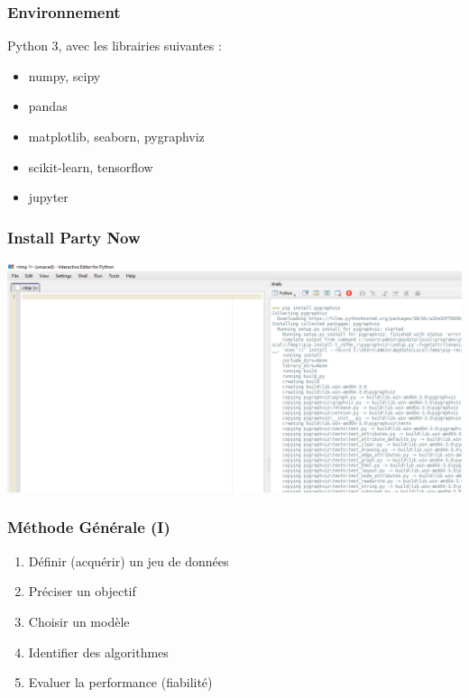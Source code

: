 \documentclass[11pt]{beamer}
\newenvironment{slide}[1]{%
\begin{frame}[environment=slide]
\frametitle{#1}
}{%
\end{frame}
}
\begin{document}
\begin{slide}{Environnement}
Python 3, avec les librairies suivantes :\\

\begin{itemize}
	\item numpy, scipy
	\item pandas
	\item matplotlib, seaborn, pygraphviz
	\item scikit-learn, tensorflow
	\item jupyter
\end{itemize}	
	
\end{slide}

\begin{slide}{Install Party Now}

\includegraphics[scale=0.25]{pyzo}

\end{slide}

\begin{slide}{Méthode Générale (I)}

\begin{enumerate}

\item Définir (acquérir) un jeu de données
\pause
\item Préciser un objectif
\pause
\item Choisir un modèle
\pause
\item Identifier des algorithmes
\pause
\item Evaluer la performance (fiabilité)

\end{enumerate}

\end{slide}
\end{document}
